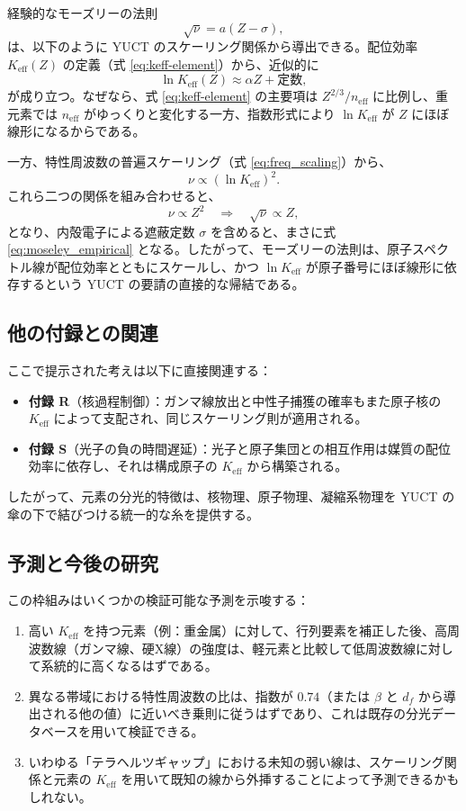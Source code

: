 \documentclass[11pt,a4paper]{article}
\begin{document}
	経験的なモーズリーの法則
	\begin{equation}
		\sqrt{\nu} = a (Z - \sigma),
		\label{eq:moseley_empirical}
	\end{equation}
	は、以下のように YUCT のスケーリング関係から導出できる。配位効率 \(K_{\mathrm{eff}}(Z)\) の定義（式 \ref{eq:keff-element}）から、近似的に
	\[
	\ln K_{\mathrm{eff}}(Z) \approx \alpha Z + \text{定数},
	\]
	が成り立つ。なぜなら、式 \ref{eq:keff-element} の主要項は \(Z^{2/3}/n_{\mathrm{eff}}\) に比例し、重元素では \(n_{\mathrm{eff}}\) がゆっくりと変化する一方、指数形式により \(\ln K_{\mathrm{eff}}\) が \(Z\) にほぼ線形になるからである。
	
	一方、特性周波数の普遍スケーリング（式 \ref{eq:freq_scaling}）から、
	\[
	\nu \propto (\ln K_{\mathrm{eff}})^2.
	\]
	これら二つの関係を組み合わせると、
	\[
	\nu \propto Z^2 \quad \Longrightarrow \quad \sqrt{\nu} \propto Z,
	\]
	となり、内殻電子による遮蔽定数 \(\sigma\) を含めると、まさに式 \ref{eq:moseley_empirical} となる。したがって、モーズリーの法則は、原子スペクトル線が配位効率とともにスケールし、かつ \(\ln K_{\mathrm{eff}}\) が原子番号にほぼ線形に依存するという YUCT の要請の直接的な帰結である。
	
	\subsection{他の付録との関連}
	
	ここで提示された考えは以下に直接関連する：
	\begin{itemize}
		\item \textbf{付録 R}（核過程制御）：ガンマ線放出と中性子捕獲の確率もまた原子核の \(K_{\mathrm{eff}}\) によって支配され、同じスケーリング則が適用される。
		\item \textbf{付録 S}（光子の負の時間遅延）：光子と原子集団との相互作用は媒質の配位効率に依存し、それは構成原子の \(K_{\mathrm{eff}}\) から構築される。
	\end{itemize}
	したがって、元素の分光的特徴は、核物理、原子物理、凝縮系物理を YUCT の傘の下で結びつける統一的な糸を提供する。
	
	\subsection{予測と今後の研究}
	
	この枠組みはいくつかの検証可能な予測を示唆する：
	\begin{enumerate}
		\item 高い \(K_{\mathrm{eff}}\) を持つ元素（例：重金属）に対して、行列要素を補正した後、高周波数線（ガンマ線、硬X線）の強度は、軽元素と比較して低周波数線に対して系統的に高くなるはずである。
		\item 異なる帯域における特性周波数の比は、指数が \(0.74\)（または \(\beta\) と \(d_f\) から導出される他の値）に近いべき乗則に従うはずであり、これは既存の分光データベースを用いて検証できる。
		\item いわゆる「テラヘルツギャップ」における未知の弱い線は、スケーリング関係と元素の \(K_{\mathrm{eff}}\) を用いて既知の線から外挿することによって予測できるかもしれない。
	\end{enumerate}
	
\end{document}
